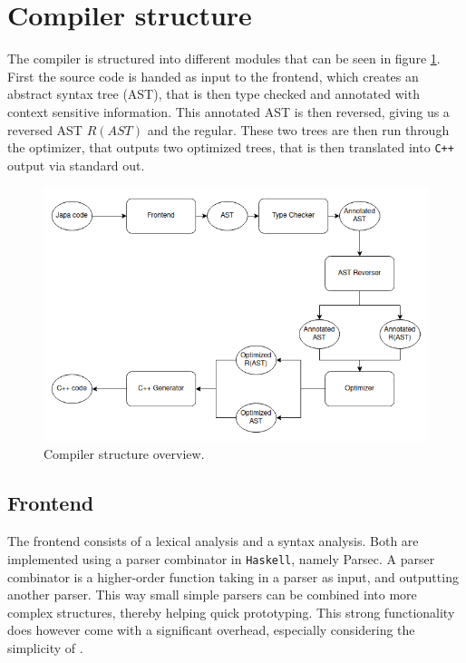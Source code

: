 \section{Compiler structure}
The \lan compiler is structured into different modules that can be seen in figure
\ref{fig:compiler-overview}. First the \lan source code is handed as input to the frontend,
which creates an abstract syntax tree (AST), that is then type checked and annotated with
context sensitive information. This annotated AST is then reversed, giving us a reversed AST
$R(AST)$ and the regular. These two trees are then run through the optimizer, that outputs
two optimized trees, that is then translated into \texttt{C++} output via standard out.

\begin{figure}[h!]
    \centering
    \includegraphics[scale=0.6]{imgs/compiler-overview.png}
    \caption{Compiler structure overview.}
    \label{fig:compiler-overview}
\end{figure}

\subsection{Frontend}
The frontend consists of a lexical analysis and a syntax analysis. Both are implemented using a
parser combinator in \texttt{Haskell}, namely Parsec. A parser combinator is a higher-order
function taking in a parser as input, and outputting another parser. This way small simple parsers
can be combined into more complex structures, thereby helping quick prototyping. This strong
functionality does however come with a significant overhead, especially considering the simplicity
of \lan \cite{parser}.

